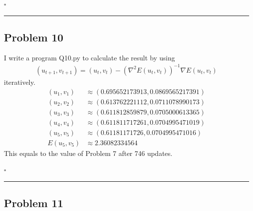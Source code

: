 \documentclass[12pt]{article}
\newcommand*{\QEDB}{\hfill\ensuremath{\square}}
\newcommand{\ParTh}[1]{\left(#1\right)}
\newcommand{\horrule}[1]{\rule{\linewidth}{#1}}
\begin{document}
\QEDB

\horrule{0.5pt}

\subsection*{Problem 10}

I write a program Q10.py to calculate the result by using
\begin{align}
\ParTh{u_{t+1},v_{t+1}}=\ParTh{u_t,v_t}-\ParTh{\nabla^2E\ParTh{u_t,v_t}}^{-1}\nabla E\ParTh{u_t,v_t}
\end{align}
iteratively.
\begin{align}
\ParTh{u_1,v_1}&\approx\ParTh{0.695652173913, 0.0869565217391}\\
\ParTh{u_2,v_2}&\approx\ParTh{0.613762221112, 0.0711078990173}\\
\ParTh{u_3,v_3}&\approx\ParTh{0.611812859879, 0.0705000613365}\\
\ParTh{u_4,v_4}&\approx\ParTh{0.611811717261, 0.0704995471019}\\
\ParTh{u_5,v_5}&\approx\ParTh{0.61181171726, 0.0704995471016}\\
E\ParTh{u_5,v_5}&\approx2.36082334564
\end{align}
This equals to the value of Problem 7 after 746 updates.

\QEDB

\horrule{0.5pt}

\subsection*{Problem 11}
\end{document}
